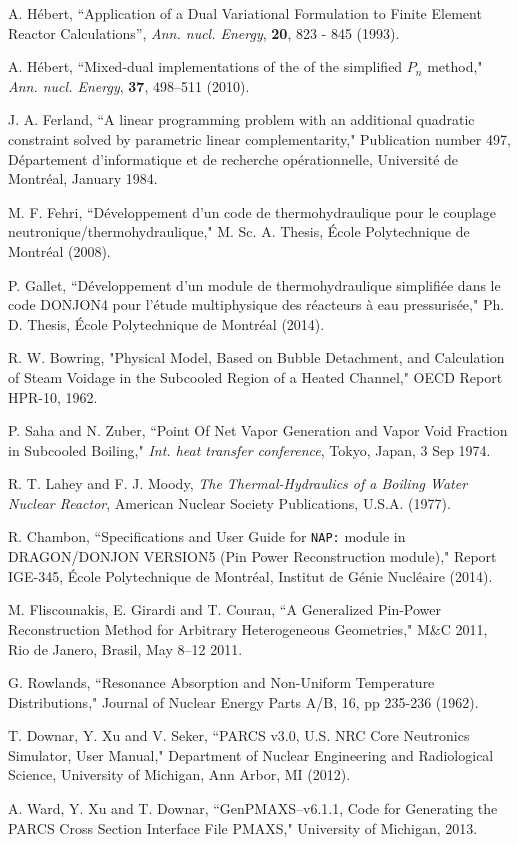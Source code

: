 \begin{thebibliography}{99}
A. H\'ebert, ``Application of a Dual Variational Formulation to Finite Element Reactor Calculations'', {\sl Ann. nucl. Energy}, {\bf 20}, 823 - 845 (1993).

A. H\'ebert, ``Mixed-dual implementations of the of the simplified $P_n$ method," {\sl Ann. nucl. Energy}, {\bf 37}, 498--511 (2010).

J. A. Ferland, ``A linear programming problem with an additional
quadratic constraint solved by parametric linear complementarity,"
Publication number 497, D\'epartement d'informatique et de recherche
op\'erationnelle, Universit\'e de Montr\'eal, January 1984.

 M. F. Fehri, ``D\'eveloppement d'un code de thermohydraulique pour le couplage neutro\-nique/thermohydraulique,"
M. Sc. A. Thesis, \'Ecole Polytechnique de Montr\'eal (2008).

 P. Gallet, ``D\'eveloppement d'un module de thermohydraulique simplifi\'ee dans le code DONJON4 pour l'\'etude multiphysique
des r\'eacteurs \`a eau pressuris\'ee," Ph. D. Thesis, \'Ecole Polytechnique de Montr\'eal (2014).

R. W. Bowring, "Physical Model, Based on Bubble Detachment, and Calculation of Steam Voidage in the Subcooled
Region of a Heated Channel," OECD Report HPR-10, 1962.

P. Saha and N. Zuber, ``Point Of Net Vapor Generation and Vapor Void Fraction in Subcooled Boiling," {\sl Int. heat transfer conference}, Tokyo, Japan, 3 Sep 1974.

R. T. Lahey and F. J. Moody, {\sl The Thermal-Hydraulics of a Boiling Water Nuclear Reactor},
American Nuclear Society Publications, U.S.A. (1977).

R. Chambon, ``Specifications and User Guide for {\tt NAP:} module in DRAGON/DONJON VERSION5
(Pin Power Reconstruction module)," Report IGE-345,
\'Ecole Polytechnique de Montr\'eal,
 Institut de G\'enie Nucl\'eaire (2014).

M. Fliscounakis, E. Girardi and T. Courau, ``A Generalized Pin-Power Reconstruction Method for
Arbitrary Heterogeneous Geometries," M\&C 2011, Rio de Janero, Brasil, May 8--12 2011.

G. Rowlands, ``Resonance Absorption and Non-Uniform Temperature Distributions," Journal of
Nuclear Energy Parts A/B, 16, pp 235-236 (1962).

T. Downar, Y. Xu and V. Seker, ``PARCS v3.0, U.S. NRC Core Neutronics Simulator, User Manual," Department of Nuclear Engineering and Radiological Science, University of Michigan, Ann Arbor, MI (2012).

A. Ward, Y. Xu and T. Downar, ``GenPMAXS--v6.1.1, Code for Generating the PARCS Cross Section Interface File PMAXS," University of Michigan, 2013.

\end{thebibliography}
